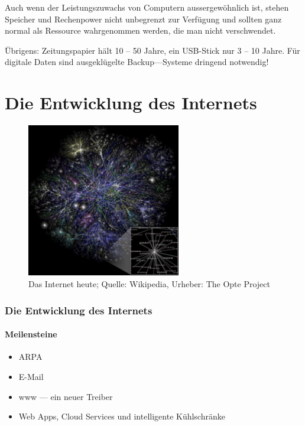   Auch wenn der Leistungszuwachs von Computern aussergewöhnlich ist, stehen Speicher und Rechenpower nicht unbegrenzt zur Verfügung und sollten ganz normal als Ressource wahrgenommen werden, die man nicht verschwendet.

  Übrigens: Zeitungspapier hält 10 -- 50 Jahre, ein USB-Stick nur 3 -- 10 Jahre. Für digitale Daten sind ausgeklügelte Backup---Systeme dringend notwendig!
    


\section{Die Entwicklung des Internets}
  
  \begin{frame}
    \begin{figure}
      \begin{center}  
        \includegraphics[width=0.6\textwidth]{pics/internet}
      \end{center}
      \pause
      \caption{Das Internet heute; Quelle: Wikipedia, Urheber: The Opte Project}
    \end{figure}
  \end{frame}

  \begin{frame}
		\frametitle<beamer>{Die Entwicklung des Internets}
		\framesubtitle{Meilensteine}
			\begin{itemize}
			\item ARPA
			\item E-Mail
			\item www --- ein neuer Treiber
			\item Web Apps, Cloud Services und intelligente Kühlschränke
		\end{itemize}
	\end{frame}

